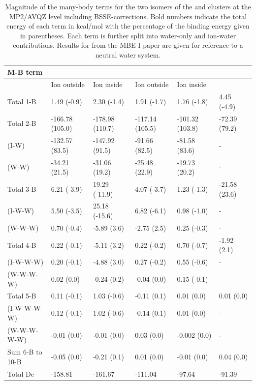 \documentclass[11pt, proquest]{uwthesis}[2020/02/24]
\let\ce\ch
\begin{document}
\begin{table}[]
\begin{tabular}{@{}llllll@{}}
\toprule
\textbf{M-B term} & \multicolumn{2}{l}{\ce{Li^+(H2O)9}}     & \multicolumn{2}{l}{\ce{Cl^-(H2O)9}}     & \ce{(H2O)_{10}}       \\ \hline
                  & Ion outside     & Ion inside      & Ion outside     & Ion inside      &               \\ \hline
Total 1-B         & 1.49 (-0.9)     & 2.30 (-1.4)     & 1.91 (-1.7)     & 1.76 (-1.8)     & 4.45 (-4.9)   \\ \hline
Total 2-B         & -166.78 (105.0) & -178.98 (110.7) & -117.14 (105.5) & -101.32 (103.8) & -72.39 (79.2) \\
(I-W)             & -132.57 (83.5)  & -147.92 (91.5)  & -91.66 (82.5)   & -81.58 (83.6)   & -             \\
(W-W)             & -34.21 (21.5)   & -31.06 (19.2)   & -25.48 (22.9)   & -19.73 (20.2)   & -             \\ \hline
Total 3-B         & 6.21 (-3.9)     & 19.29 (-11.9)   & 4.07 (-3.7)     & 1.23 (-1.3)     & -21.58 (23.6) \\
(I-W-W)           & 5.50 (-3.5)     & 25.18 (-15.6)   & 6.82 (-6.1)     & 0.98 (-1.0)     & -             \\
(W-W-W)           & 0.70 (-0.4)     & -5.89 (3.6)     & -2.75 (2.5)     & 0.25 (-0.3)     & -             \\ \hline
Total 4-B         & 0.22 (-0.1)     & -5.11 (3.2)     & 0.22 (-0.2)     & 0.70 (-0.7)     & -1.92 (2.1)   \\
(I-W-W-W)         & 0.20 (-0.1)     & -4.88 (3.0)     & 0.27 (-0.2)     & 0.55 (-0.6)     & -             \\
(W-W-W-W)         & 0.02 (0.0)      & -0.24 (0.2)     & -0.04 (0.0)     & 0.15 (-0.1)     & -             \\ \hline
Total 5-B         & 0.11 (-0.1)     & 1.03 (-0.6)     & -0.11 (0.1)     & 0.01 (0.0)      & 0.01 (0.0)    \\
(I-W-W-W-W)       & 0.12 (-0.1)     & 1.02 (-0.6)     & -0.14 (0.1)     & 0.01 (0.0)      & -             \\
(W-W-W-W-W)       & -0.01 (0.0)     & -0.01 (0.0)     & 0.03 (0.0)      & -0.002 (0.0)    & -             \\ \hline
Sum 6-B to 10-B   & -0.05 (0.0)     & -0.21 (0.1)     & 0.01 (0.0)      & -0.01 (0.0)     & 0.04 (0.0)    \\ \hline
Total De          & -158.81         & -161.67         & -111.04         & -97.64          & -91.39       \\ \bottomrule
\end{tabular}
\caption{Magnitude of the many-body terms for the two isomers of the \ce{Li^+(H2O)9} and \ce{Cl^-(H2O)9} clusters at the MP2/AVQZ level including BSSE-corrections. Bold numbers indicate the total energy of each term in kcal/mol with the percentage of the binding energy given in parentheses. Each term is further split into water-only and ion-water contributions. Results for \ce{(H2O)_{10}} from the MBE-I paper are given for reference to a neutral water system.}
\label{tab:MBE_II_1}
\end{table}
\end{document}

